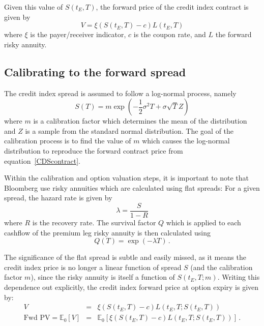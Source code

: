 \documentclass[11pt]{article}
\begin{document}
Given this value of $S(t_E,T)$, the forward price of the credit index contract is given by
\begin{equation}
V = \xi \left( S(t_E,T)  - c\right) L(t_E,T )
\label{CDScontract}
\end{equation}
where $\xi$ is the payer/receiver indicator, $c$ is the coupon rate, and $L$ the forward risky annuity.


\subsection{Calibrating to the forward spread}
The credit index spread is assumed to follow a log-normal process, namely
\begin{equation}
S(T) = m \exp\left( -\textstyle\frac{1}{2}\sigma^2T + \sigma\sqrt T Z\right)
\label{logNormalSpread}
\end{equation}
where $m$ is a calibration factor which determines the mean of the distribution and $Z$ is a sample from the standard normal distribution. The goal of the calibration process is to find the value of $m$ which causes the log-normal distribution to reproduce the forward contract price from equation~\ref{CDScontract}.

Within the calibration and option valuation steps, it is important to note that Bloomberg use risky annuities which are calculated using flat spreads: For a given spread, the hazard rate is given by
\begin{equation}
\lambda = \frac{S}{1-R}
\end{equation}
where $R$ is the recovery rate. The survival factor $Q$ which is applied to each cashflow of the premium leg risky annuity is then calculated using
\begin{equation}
Q(T) = \exp( -\lambda T)\, .
\end{equation}

The significance of the flat spread is subtle and easily missed, as it means the credit index price is no longer a linear function of spread $S$ (and the calibration factor $m$), since the risky annuity is itself a function of $S(t_E,T; m)$. Writing this dependence out explicitly, the credit index forward price at option expiry is given by:
\begin{eqnarray}
V &=& \xi \left( S(t_E,T)  - c\right) L(t_E,T; S(t_E,T)) \\
\mbox{Fwd PV} = \mathbb{E}_0 \left[ V  \right] &=& \mathbb{E}_0\left[ \xi \left( S(t_E,T)  - c\right) L(t_E,T; S(t_E,T)) \right] \,.
\label{CalibrationExpectation}
\end{eqnarray}
\end{document}
